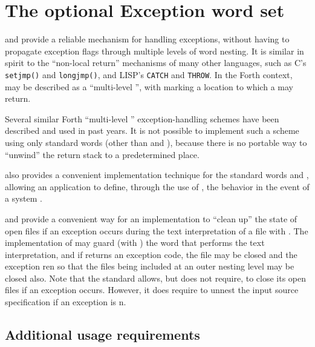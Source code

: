 \section{The optional Exception word set} %
\label{rat:exception}

 and  provide a reliable mechanism for
handling exceptions, without having to propagate exception flags
through multiple levels of word nesting. It is similar in spirit
to the ``non-local return'' mechanisms of many other languages,
such as C's \texttt{setjmp()} and \texttt{longjmp()}, and LISP's
\texttt{CATCH} and \texttt{THROW}. In the Forth context, 
may be described as a ``multi-level '', with
 marking a location to which a  may return.

Several similar Forth ``multi-level ''
exception-handling schemes have been described and used in past years.
It is not possible to implement such a scheme using only standard words
(other than  and ), because there is no portable
way to ``unwind'' the return stack to a predetermined place.

 also provides a convenient implementation technique for
the standard words  and , allowing an
application to define, through the use of , the behavior
in the event of a system .

 and  provide a convenient way for an
implementation to ``clean up'' the state of open files if an
exception occurs during the text interpretation of a file with
. The implementation of
 may guard (with ) the word
that performs the text interpretation, and if  returns
an exception code, the file may be closed and the exception
ren so that the files being included at an outer nesting
level may be closed also. Note that the standard allows, but does not
require,  to close its open files if an
exception occurs. However, it does require 
to unnest the input source specification if an exception is
n.

\setcounter{subsection}{2}
\subsection{Additional usage requirements} %

